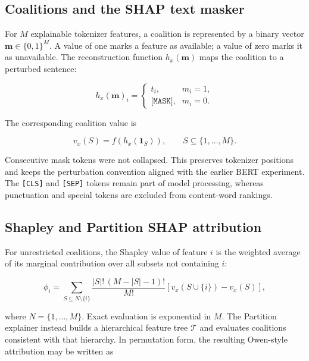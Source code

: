 \documentclass[11pt,a4paper]{article}
\begin{document}
\subsection{Coalitions and the SHAP text masker}

For \(M\) explainable tokenizer features, a coalition is represented by a binary
vector \(\mathbf{m}\in\{0,1\}^{M}\). A value of one marks a feature as available;
a value of zero marks it as unavailable. The reconstruction function
\(h_x(\mathbf{m})\) maps the coalition to a perturbed sentence:

\begin{equation}
  h_x(\mathbf{m})_i =
  \begin{cases}
    t_i, & m_i=1,\\
    \texttt{[MASK]}, & m_i=0.
  \end{cases}
  \label{eq:masker}
\end{equation}

The corresponding coalition value is

\begin{equation}
  v_x(S)=f\!\left(h_x(\mathbf{1}_S)\right),
  \qquad S\subseteq\{1,\ldots,M\}.
  \label{eq:coalition-value}
\end{equation}

Consecutive mask tokens were not collapsed. This preserves tokenizer positions
and keeps the perturbation convention aligned with the earlier BERT experiment.
The \texttt{[CLS]} and \texttt{[SEP]} tokens remain part of model processing,
whereas punctuation and special tokens are excluded from content-word rankings.

\subsection{Shapley and Partition SHAP attribution}

For unrestricted coalitions, the Shapley value of feature \(i\) is the weighted
average of its marginal contribution over all subsets not containing \(i\):

\begin{equation}
  \phi_i =
  \sum_{S\subseteq N\setminus\{i\}}
  \frac{|S|!\,(M-|S|-1)!}{M!}
  \left[v_x(S\cup\{i\})-v_x(S)\right],
  \label{eq:shapley}
\end{equation}

where \(N=\{1,\ldots,M\}\). Exact evaluation is exponential in \(M\). The
Partition explainer instead builds a hierarchical feature tree \(\mathcal{T}\)
and evaluates coalitions consistent with that hierarchy. In permutation form,
the resulting Owen-style attribution may be written as
\end{document}
